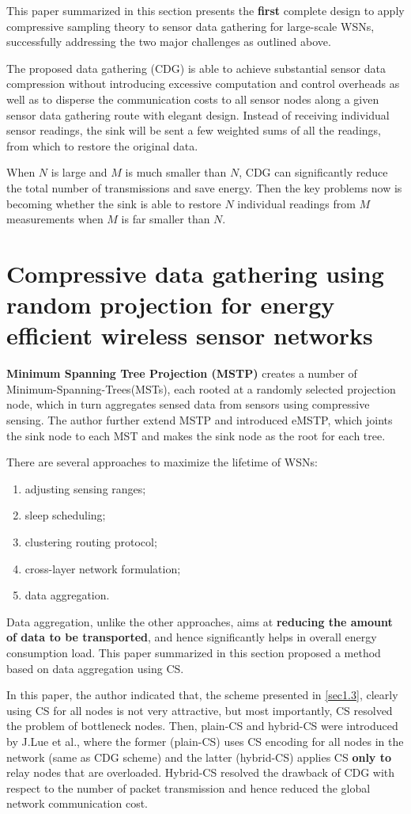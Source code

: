 This paper summarized in this section presents the \textbf{\textcolor[rgb]{1,0,0}{first}} complete design to apply compressive sampling theory to sensor data gathering for large-scale WSNs, successfully addressing the two major challenges as outlined above. 

The proposed data gathering (CDG) is able to achieve substantial sensor data compression without introducing excessive computation and control overheads as well as to disperse the communication costs to all sensor nodes along a given sensor data gathering route with elegant design. Instead of receiving individual sensor readings, the sink will be sent a few weighted sums of all the readings, from which to restore the original data. 

When $N$ is large and $M$ is much smaller than $N$, CDG can significantly reduce the total number of transmissions and save energy. Then the key problems now is becoming whether the sink is able to restore $N$ individual readings from $M$ measurements when $M$ is far smaller than $N$. 

\section{Compressive data gathering using random projection for energy efficient wireless sensor networks}
\label{sec1.4}
\textbf{\textcolor[rgb]{1,0,0}{Minimum Spanning Tree Projection (MSTP)}} creates a number of Minimum-Spanning-Trees(MSTs), each rooted at a randomly selected projection node, which in turn aggregates sensed data from sensors using compressive sensing. The author further extend MSTP and introduced eMSTP, which joints the sink node to each MST and makes the sink node as the root for each tree.

There are several approaches to maximize the lifetime of WSNs:
\begin{enumerate}
    \item adjusting sensing ranges;
    \item sleep scheduling;
    \item clustering routing protocol;
    \item cross-layer network formulation;
    \item data aggregation. 
\end{enumerate}
Data aggregation, unlike the other approaches, aims at \textbf{\textcolor[rgb]{1,0,0}{reducing the amount of data to be transported}}, and hence significantly helps in overall energy consumption load. This paper summarized in this section proposed a method based on data aggregation using CS. 

In this paper, the author indicated that, the scheme presented in \cref{sec1.3}, clearly using CS for all nodes is not very attractive, but most importantly, CS resolved the problem of bottleneck nodes. Then, \textcolor[rgb]{1,0,0}{plain-CS and hybrid-CS} were introduced by J.Lue et al., where the former (plain-CS) uses CS encoding for all nodes in the network (same as CDG scheme) and the latter (hybrid-CS) applies CS \textbf{\textcolor[rgb]{1,0,0}{only to}} \textcolor[rgb]{1,0,0}{relay nodes that are overloaded}. Hybrid-CS resolved the drawback of CDG with respect to the number of packet transmission and hence reduced the global network communication cost.
